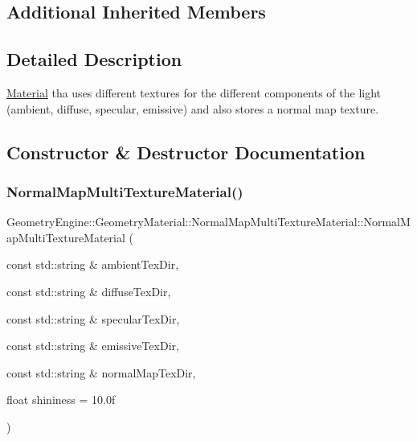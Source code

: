 \subsection*{Additional Inherited Members}


\subsection{Detailed Description}
\mbox{\hyperlink{class_geometry_engine_1_1_geometry_material_1_1_material}{Material}} tha uses different textures for the different components of the light (ambient, diffuse, specular, emissive) and also stores a normal map texture. 

\subsection{Constructor \& Destructor Documentation}
\mbox{\label{class_geometry_engine_1_1_geometry_material_1_1_normal_map_multi_texture_material_a76f36f54e5b2bc7fda38e22bc5665a42}} 
\subsubsection{\texorpdfstring{NormalMapMultiTextureMaterial()}{NormalMapMultiTextureMaterial()}\hspace{0.1cm}{\footnotesize\ttfamily [1/2]}}
{\footnotesize\ttfamily Geometry\+Engine\+::\+Geometry\+Material\+::\+Normal\+Map\+Multi\+Texture\+Material\+::\+Normal\+Map\+Multi\+Texture\+Material (\begin{DoxyParamCaption}\item[{const std\+::string \&}]{ambient\+Tex\+Dir,  }\item[{const std\+::string \&}]{diffuse\+Tex\+Dir,  }\item[{const std\+::string \&}]{specular\+Tex\+Dir,  }\item[{const std\+::string \&}]{emissive\+Tex\+Dir,  }\item[{const std\+::string \&}]{normal\+Map\+Tex\+Dir,  }\item[{float}]{shininess = {\ttfamily 10.0f} }\end{DoxyParamCaption})}

